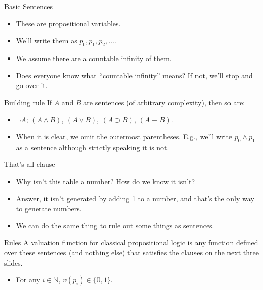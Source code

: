 \documentclass[
  17pt,
  letterpaper,
  ignorenonframetext,
  aspectratio=169,
  handout]{beamer}
\providecommand{\tightlist}{%
  \setlength{\itemsep}{0pt}\setlength{\parskip}{0pt}}\usepackage{longtable,booktabs,array}
\begin{document}
\begin{frame}{Basic Sentences}
\protect\hypertarget{basic-sentences}{}
\begin{itemize}[<+->]
\tightlist
\item
  These are propositional variables.
\item
  We'll write them as \(p_0, p_1, p_2, \dots\).
\item
  We assume there are a countable infinity of them.
\item
  Does everyone know what ``countable infinity'' means? If not, we'll
  stop and go over it.
\end{itemize}
\end{frame}

\begin{frame}{Building rule}
\protect\hypertarget{building-rule}{}
If \(A\) and \(B\) are sentences (of arbitrary complexity), then so are:

\begin{itemize}[<+->]
\tightlist
\item
  \(\neg A\); \((A \wedge B)\), \((A \vee B)\), \((A \supset B)\),
  \((A \equiv B)\).
\item
  When it is clear, we omit the outermost parentheses. E.g., we'll write
  \(p_0 \wedge p_1\) as a sentence although strictly speaking it is not.
\end{itemize}
\end{frame}

\begin{frame}{That's all clause}
\protect\hypertarget{thats-all-clause}{}
\begin{itemize}[<+->]
\tightlist
\item
  Why isn't this table a number? How do we know it isn't?
\item
  Answer, it isn't generated by adding 1 to a number, and that's the
  only way to generate numbers.
\item
  We can do the same thing to rule out some things as sentences.
\end{itemize}
\end{frame}

\begin{frame}{Rules}
\protect\hypertarget{rules}{}
A valuation function for classical propositional logic is any function
defined over these sentences (and nothing else) that satisfies the
clauses on the next three slides.

\begin{itemize}[<+->]
\tightlist
\item
  For any \(i \in \mathbb{N}\), \(v(p_i) \in \{0, 1\}\).
\end{itemize}
\end{frame}
\end{document}
